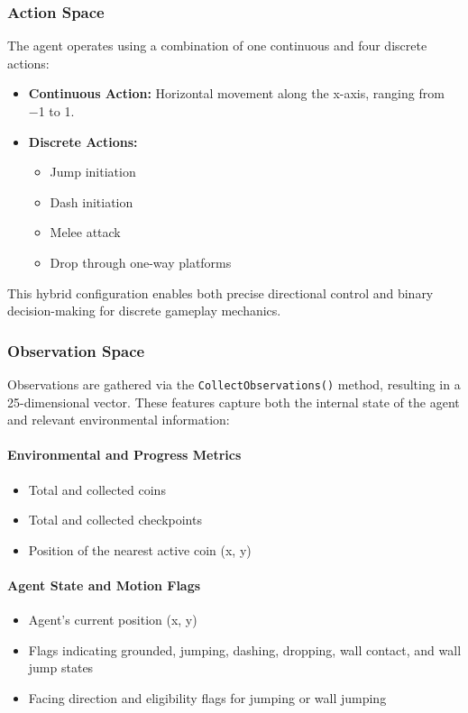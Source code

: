 \documentclass[12pt,oneside,openright,a4paper]{cpe-english-project}
\begin{document}
\subsubsection{Action Space}

The agent operates using a combination of one continuous and four discrete actions:

\begin{itemize}
\item \textbf{Continuous Action:} Horizontal movement along the x-axis, ranging from −1 to 1.
\item \textbf{Discrete Actions:}
\begin{itemize}
\item Jump initiation
\item Dash initiation
\item Melee attack
\item Drop through one-way platforms
\end{itemize}
\end{itemize}

This hybrid configuration enables both precise directional control and binary decision-making for discrete gameplay mechanics.

\subsubsection{Observation Space}

Observations are gathered via the \texttt{CollectObservations()} method, resulting in a 25-dimensional vector. These features capture both the internal state of the agent and relevant environmental information:

\paragraph{Environmental and Progress Metrics}
\begin{itemize}
\item Total and collected coins
\item Total and collected checkpoints
\item Position of the nearest active coin (x, y)
\end{itemize}

\paragraph{Agent State and Motion Flags}
\begin{itemize}
\item Agent’s current position (x, y)
\item Flags indicating grounded, jumping, dashing, dropping, wall contact, and wall jump states
\item Facing direction and eligibility flags for jumping or wall jumping
\end{itemize}
\end{document}
